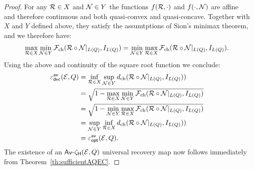 \documentclass[10pt]{article}
\newcommand{\s}[1]{\mathsf{#1}}
\begin{document}
\begin{proof}
For any ${\cal R}\in X$ and ${\cal N}\in Y$ the functions  $f({\cal R},\cdot)$ and $f(\cdot,{\cal N})$ are affine and therefore  continuous and both quasi-convex and quasi-concave. Together with $X$ and $Y$ defined above, they satisfy the
assumtptions of Sion's minimax theorem, and we therefore have: 
    \begin{align*}
       \max_{{\cal R}\in X}\min_{{\cal N}\in Y}  {\cal F}_{\mathrm{ch}}(  {\cal R}\circ{\cal N}|_{L(Q)},I_{L(Q)})=\min_{{\cal N}\in Y}\max_{{\cal R}\in X}  {\cal F}_{\mathrm{ch}}(   {\cal R}\circ{\cal N}|_{L(Q)},I_{L(Q)}).
    \end{align*}
    Using the above and continuity of the square root function we conclude: 
    \begin{align*}
        \varepsilon_{\s{dec}}^{\s{av}}(\calE,Q)&=\inf_{\calR\in X}\sup_{\calN\in Y}d_{\mathrm{ch}}( \calR\circ\calN|_{L(Q)},I_{L(Q)}))\\
        &=\sqrt{1-\max_{\calR\in X}\min_{\calN\in Y} \calF_{\mathrm{ch}}(  \calR\circ\calN|_{L(Q)},I_{L(Q)})}\\
        &=\sqrt{1-\min_{\calN\in Y}\max_{\calR\in X} \calF_{\mathrm{ch}}(  \calR\circ\calN|_{L(Q)},I_{L(Q)})}
        \\&=\sup_{\calN\in Y}\inf_{\calR\in X}d_{\mathrm{ch}}( \calR\circ\calN|_{L(Q)},I_{L(Q)}))\\
        &=\varepsilon_{\s{opt}}^{\s{av}}(\calE,Q).
    \end{align*}
    The existence of an $\s{Av}$-$\zeta_{\s{H}}(\calE,Q)$ universal recovery map now follows immediately from Theorem~\ref{th:sufficientAQEC}.
\end{proof}
     
\end{document}
